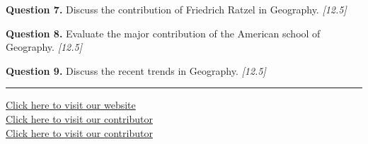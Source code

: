 \documentclass[11pt,a4paper]{article}
\newcommand{\pts}[1]{\hfill   \textit{[#1]}}
\begin{document}
\medskip


\noindent   \textbf{Question 7.} Discuss the contribution of Friedrich Ratzel in Geography. \pts{12.5}

\medskip


\noindent   \textbf{Question 8.} Evaluate the major contribution of the American school of Geography. \pts{12.5}

\medskip


\noindent   \textbf{Question 9.} Discuss the recent trends in Geography. \pts{12.5}

\vfill\rule{\linewidth}{0.4pt}

\begin{center}\small
\href{https://bhu-exam.vercel.app/}{Click here to visit our website}\\[4pt]
\href{https://me-aryan.vercel.app/}{Click here to visit our contributor}\\[4pt]
\href{https://quashan-me.vercel.app/}{Click here to visit our contributor}
\end{center}
\end{document}
